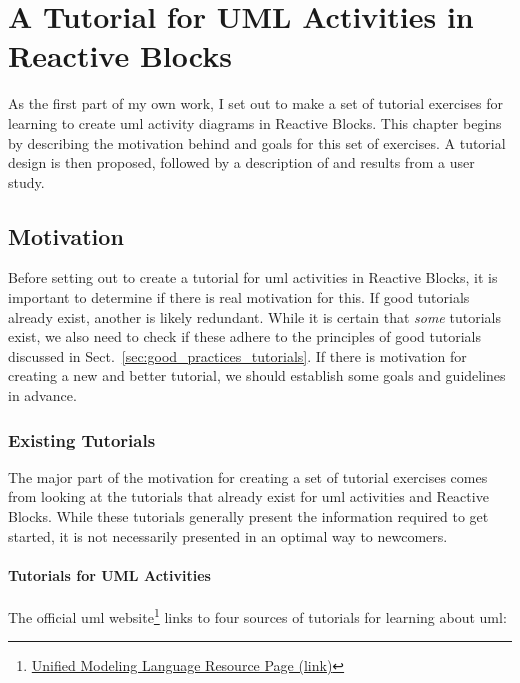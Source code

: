 \chapter{A Tutorial for UML Activities in Reactive Blocks}
\label{ch:reactive_blocks_tutorial}
As the first part of my own work, I set out to make a set of tutorial exercises for learning to create \gls{uml} activity diagrams in Reactive Blocks. This chapter begins by describing the motivation behind and goals for this set of exercises. A tutorial design is then proposed, followed by a description of and results from a user study.

\section{Motivation}
\label{sec:tutorial_motivation}
Before setting out to create a tutorial for \gls{uml} activities in Reactive Blocks, it is important to determine if there is real motivation for this. If good tutorials already exist, another is likely redundant. While it is certain that \emph{some} tutorials exist, we also need to check if these adhere to the principles of good tutorials discussed in Sect.~\ref{sec:good_practices_tutorials}. If there is motivation for creating a new and better tutorial, we should establish some goals and guidelines in advance.

\subsection{Existing Tutorials}
\label{sec:existing_tutorials}
The major part of the motivation for creating a set of tutorial exercises comes from looking at the tutorials that already exist for \gls{uml} activities and Reactive Blocks. While these tutorials generally present the information required to get started, it is not necessarily presented in an optimal way to newcomers.

\subsubsection{Tutorials for UML Activities}
The official \gls{uml} website\footnote{\href{http://www.uml.org/\#Links-Tutorials}{Unified Modeling Language Resource Page (link)}} links to four sources of tutorials for learning about \gls{uml}:

